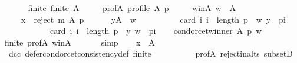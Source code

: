 \begin{isabellebody}
\ \ \isamarkupfalse%
\isanewline
\ \ \ \ finite{\isacharcolon}{\kern0pt}\ {\isachardoublequoteopen}finite\ A{\isachardoublequoteclose}\ \isanewline
\ \ \ \ prof{\isacharunderscore}{\kern0pt}A{\isacharcolon}{\kern0pt}\ {\isachardoublequoteopen}profile\ A\ p{\isachardoublequoteclose}\ \isanewline
\ \ \ \ w{\isacharunderscore}{\kern0pt}in{\isacharunderscore}{\kern0pt}A{\isacharcolon}{\kern0pt}\ {\isachardoublequoteopen}w\ {\isasymin}\ A{\isachardoublequoteclose}\ \isanewline
\ \ \ \ {}{\isacharcolon}{\kern0pt}\ {\isachardoublequoteopen}x\ {\isasymin}\ reject\ m\ A\ p{\isachardoublequoteclose}\ \isanewline
\ \ \ \ {}{\isacharcolon}{\kern0pt}\ {\isachardoublequoteopen}{\isasymforall}y{\isasymin}A\ {\isacharminus}{\kern0pt}\ {\isacharbraceleft}{\kern0pt}w{\isacharbraceright}{\kern0pt}{\isachardot}{\kern0pt}\isanewline
\ \ \ \ \ \ \ \ \ \ card\ {\isacharbraceleft}{\kern0pt}i{\isachardot}{\kern0pt}\ i\ {\isacharless}{\kern0pt}\ length\ p\ {\isasymand}\ {\isacharparenleft}{\kern0pt}w{\isacharcomma}{\kern0pt}\ y{\isacharparenright}{\kern0pt}\ {\isasymin}\ {\isacharparenleft}{\kern0pt}p{\isacharbang}{\kern0pt}i{\isacharparenright}{\kern0pt}{\isacharbraceright}{\kern0pt}\ {\isacharless}{\kern0pt}\isanewline
\ \ \ \ \ \ \ \ \ \ \ \ card\ {\isacharbraceleft}{\kern0pt}i{\isachardot}{\kern0pt}\ i\ {\isacharless}{\kern0pt}\ length\ p\ {\isasymand}\ {\isacharparenleft}{\kern0pt}y{\isacharcomma}{\kern0pt}\ w{\isacharparenright}{\kern0pt}\ {\isasymin}\ {\isacharparenleft}{\kern0pt}p{\isacharbang}{\kern0pt}i{\isacharparenright}{\kern0pt}{\isacharbraceright}{\kern0pt}{\isachardoublequoteclose}\isanewline
\ \ \isamarkupfalse%
\ {\isachardoublequoteopen}condorcet{\isacharunderscore}{\kern0pt}winner\ A\ p\ w{\isachardoublequoteclose}\isanewline
\ \ \ \ \isamarkupfalse%
\ finite\ prof{\isacharunderscore}{\kern0pt}A\ w{\isacharunderscore}{\kern0pt}in{\isacharunderscore}{\kern0pt}A\ {\isachardoublequoteopen}{}{\isachardoublequoteclose}\isanewline
\ \ \ \ \isamarkupfalse%
\ simp\isanewline
\ \ \isamarkupfalse%
\ {\isachardoublequoteopen}x\ {\isasymin}\ A{\isachardoublequoteclose}\isanewline
\ \ \ \ \isamarkupfalse%
\ {\isachardoublequoteopen}{}{\isachardoublequoteclose}\ dcc\ defer{\isacharunderscore}{\kern0pt}condorcet{\isacharunderscore}{\kern0pt}consistency{\isacharunderscore}{\kern0pt}def\ finite\isanewline
\ \ \ \ \ \ \ \ \ \ prof{\isacharunderscore}{\kern0pt}A\ reject{\isacharunderscore}{\kern0pt}in{\isacharunderscore}{\kern0pt}alts\ subsetD\isanewline

\end{isabellebody}
